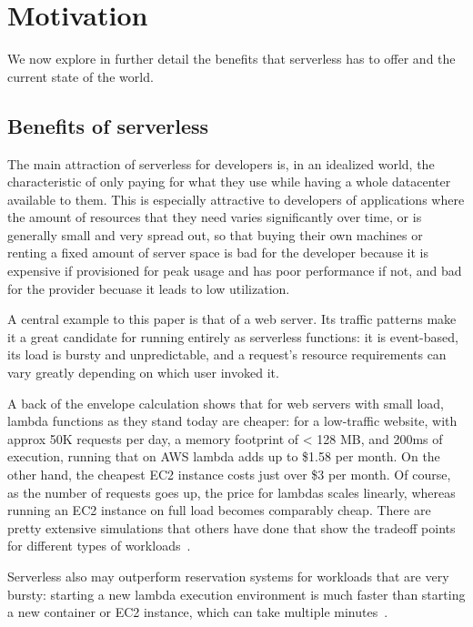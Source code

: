 \section{Motivation}\label{motivation}

We now explore in further detail the benefits that serverless has to offer and
the current state of the world.

\subsection{Benefits of serverless}

The main attraction of serverless for developers is, in an idealized world, the
characteristic of only paying for what they use while having a whole datacenter
available to them. This is especially attractive to developers of applications
where the amount of resources that they need varies significantly over time, or
is generally small and very spread out, so that buying their own machines or
renting a fixed amount of server space is bad for the developer because it is
expensive if provisioned for peak usage and has poor performance if not, and bad
for the provider becuase it leads to low utilization.

A central example to this paper is that of a web server. Its traffic patterns
make it a great candidate for running entirely as serverless functions: it is
event-based, its load is bursty and unpredictable, and a request's resource
requirements can vary greatly depending on which user invoked it.


A back of the envelope calculation shows that for web servers with small load,
lambda functions as they stand today are cheaper: for a low-traffic website,
with approx 50K requests per day, a memory footprint of < 128 MB, and 200ms of
execution, running that on AWS lambda adds up to \$1.58 per month. On the other
hand, the cheapest EC2 instance costs just over \$3 per month. Of course, as the
number of requests goes up, the price for lambdas scales linearly, whereas
running an EC2 instance on full load becomes comparably cheap. There are pretty
extensive simulations that others have done that show the tradeoff points for
different types of workloads~\cite{econ-of-serverless,trek10-blog}.

Serverless also may outperform reservation systems for workloads that are very
bursty: starting a new lambda execution environment is much faster than starting
a new container or EC2 instance, which can take multiple
minutes~\cite{ec2-autoscaling}.


